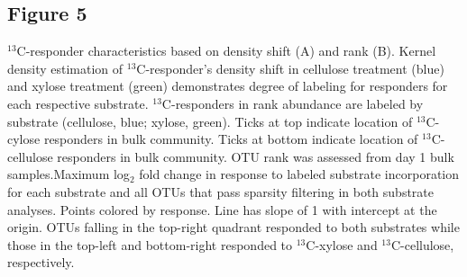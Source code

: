     \subsection{Figure 5}
$^{13}$C-responder characteristics based on density shift (A) and rank (B).
Kernel density estimation of $^{13}$C-responder's density shift in cellulose
treatment (blue) and xylose treatment (green) demonstrates degree of labeling
for responders for each respective substrate. $^{13}$C-responders in rank
abundance are labeled by substrate (cellulose, blue; xylose, green). Ticks at top indicate
location of $^{13}$C-cylose responders in bulk community. Ticks at bottom indicate location of
$^{13}$C-cellulose responders in bulk community. OTU rank was assessed from day 1 bulk samples.Maximum log$_{2}$ fold change in response to labeled substrate incorporation for each substrate and all OTUs that pass sparsity filtering in both substrate analyses. Points colored by response. Line has slope of 1 with intercept at the origin. OTUs falling in the top-right quadrant responded to both substrates while those in the top-left and bottom-right responded to $^{13}$C-xylose and $^{13}$C-cellulose, respectively.